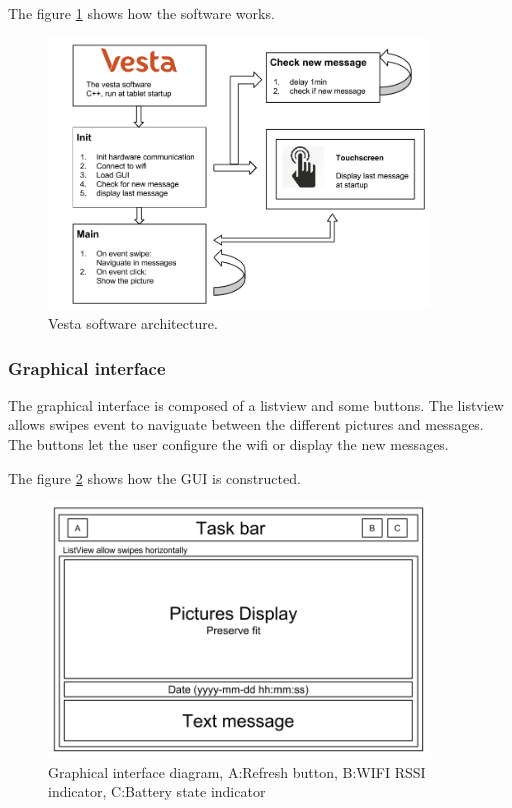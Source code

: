 The figure \ref{fig:soft archi} shows how the software works.

\begin{figure}[!htb]
    \centering
    \includegraphics[width=0.9\textwidth,keepaspectratio]{chap/softFig/vesta_software_diagram2}
    \caption{Vesta software architecture.}
    \label{fig:soft archi}
\end{figure}

\subsubsection{Graphical interface}
The graphical interface is composed of a listview and some buttons. The listview allows swipes event to naviguate between the different pictures and messages. The buttons let the user configure the wifi or display the new messages.

The figure \ref{fig:gui diagram} shows how the GUI is constructed.

\begin{figure}[!htb]
    \centering
    \includegraphics[width=0.9\textwidth,keepaspectratio]{chap/softFig/GUI_diagram}
    \caption{Graphical interface diagram, A:Refresh button, B:WIFI RSSI indicator, C:Battery state indicator}
    \label{fig:gui diagram}
\end{figure}

